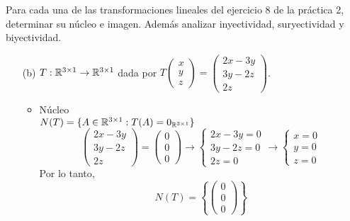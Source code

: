 \item Para cada una de las transformaciones lineales del ejercicio 8 de la práctica 2, determinar su núcleo e imagen. Además analizar inyectividad, suryectividad y biyectividad.
    \begin{mdframed}[style=s]
        \begin{enumerate}
            \item[(b)] $T:\mathbb{R}^{3\times1}\to\mathbb{R}^{3\times1}$ dada por $T\begin{pmatrix}
                    x\\y\\z
                \end{pmatrix}=\begin{pmatrix}
                    2x-3y\\3y-2z\\2z
                \end{pmatrix}$.
                \begin{itemize}
                    \item Núcleo\\
                        $N(T)=\{A\in\mathbb{R}^{3\times1}:T(A)=0_{\mathbb{R}^{3\times1}}\}$\[\begin{pmatrix}
                                2x-3y\\3y-2z\\2z
                        \end{pmatrix}=\begin{pmatrix}
                            0\\0\\0
                        \end{pmatrix}\to\begin{cases}
                            2x-3y=0\\
                            3y-2z=0\\
                            2z=0
                        \end{cases}\to\begin{cases}
                            x=0\\
                            y=0\\
                            z=0
                        \end{cases}\]
                        Por lo tanto, \[N(T)=\left\{\begin{pmatrix}
                            0\\0\\0
                        \end{pmatrix}\right\}\]

\end{itemize}
\end{enumerate}
\end{mdframed}
